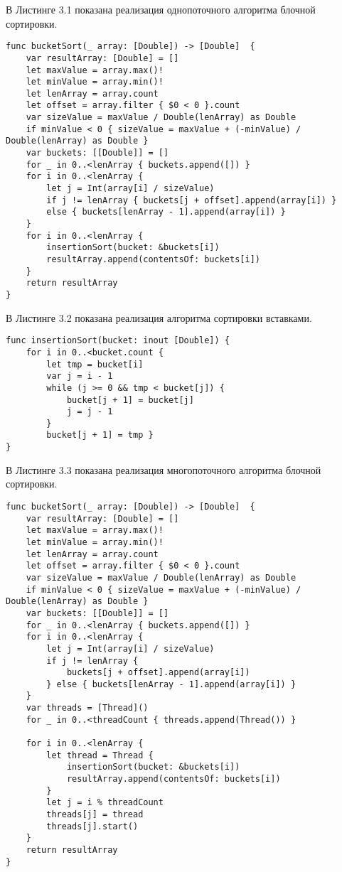 \hspace{0.6cm}В Листинге 3.1 показана реализация однопоточного алгоритма блочной сортировки.
\begin{lstlisting}[caption=Функция алгоритма блочной сортировки однопоточная]
func bucketSort(_ array: [Double]) -> [Double]  {
    var resultArray: [Double] = []
    let maxValue = array.max()!
    let minValue = array.min()!
    let lenArray = array.count
    let offset = array.filter { $0 < 0 }.count
    var sizeValue = maxValue / Double(lenArray) as Double
    if minValue < 0 { sizeValue = maxValue + (-minValue) / Double(lenArray) as Double }
    var buckets: [[Double]] = []
    for _ in 0..<lenArray { buckets.append([]) }
    for i in 0..<lenArray {
        let j = Int(array[i] / sizeValue)
        if j != lenArray { buckets[j + offset].append(array[i]) } 
        else { buckets[lenArray - 1].append(array[i]) }
    }
    for i in 0..<lenArray {
        insertionSort(bucket: &buckets[i])
        resultArray.append(contentsOf: buckets[i])
    }
    return resultArray
}
\end{lstlisting}


\hspace{0.6cm}В Листинге 3.2 показана реализация алгоритма сортировки вставками.
\begin{lstlisting}[caption=Функция алгоритма сортировки вставками]
func insertionSort(bucket: inout [Double]) {
    for i in 0..<bucket.count {
        let tmp = bucket[i]
        var j = i - 1
        while (j >= 0 && tmp < bucket[j]) {
            bucket[j + 1] = bucket[j]
            j = j - 1
        }
        bucket[j + 1] = tmp }
}
\end{lstlisting}

\hspace{0.6cm}В Листинге 3.3 показана реализация многопоточного алгоритма блочной сортировки.
\begin{lstlisting}[caption=Функция алгоритма блочной сортировки многопоточная]
func bucketSort(_ array: [Double]) -> [Double]  {
    var resultArray: [Double] = []
    let maxValue = array.max()!
    let minValue = array.min()!
    let lenArray = array.count
    let offset = array.filter { $0 < 0 }.count
    var sizeValue = maxValue / Double(lenArray) as Double
    if minValue < 0 { sizeValue = maxValue + (-minValue) / Double(lenArray) as Double }
    var buckets: [[Double]] = []
    for _ in 0..<lenArray { buckets.append([]) }
    for i in 0..<lenArray {
        let j = Int(array[i] / sizeValue)
        if j != lenArray {
            buckets[j + offset].append(array[i])
        } else { buckets[lenArray - 1].append(array[i]) }
    }
    var threads = [Thread]()
    for _ in 0..<threadCount { threads.append(Thread()) }
    
    for i in 0..<lenArray {
        let thread = Thread {
            insertionSort(bucket: &buckets[i])
            resultArray.append(contentsOf: buckets[i])
        }
        let j = i % threadCount
        threads[j] = thread
        threads[j].start()
    }    
    return resultArray
}
\end{lstlisting}

